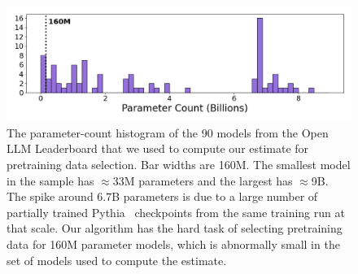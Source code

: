 \documentclass{article} %
\begin{document}
\begin{figure}[t]
\centering
\includegraphics[width=\textwidth]{images/param-count-dist.png}
\caption{The parameter-count histogram of the 90 models from the Open LLM Leaderboard \citep{openllmleaderboard} that we used to compute our estimate for pretraining data selection. Bar widths are 160M. The smallest model in the sample has $\approx$33M parameters and the largest has $\approx$9B. The spike around $6.7$B parameters is due to a large number of partially trained Pythia~\citep{pythia} checkpoints from the same training run at that scale. Our algorithm has the hard task of selecting pretraining data for 160M parameter models, which is abnormally small in the set of models used to compute the estimate.}
\label{paramhist}
\end{figure}
\end{document}
